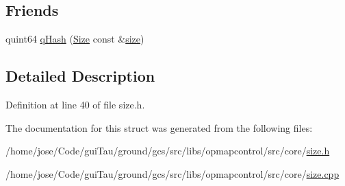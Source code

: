 \subsection*{Friends}
\begin{DoxyCompactItemize}
\item 
quint64 \hyperlink{group___o_p_map_widget_ga49c2077e2f80e6178a3dfbda52f03e88}{q\-Hash} (\hyperlink{structcore_1_1_size}{Size} const \&\hyperlink{glext_8h_a014d89bd76f74ef3a29c8f04b473eb76}{size})
\end{DoxyCompactItemize}


\subsection{Detailed Description}


Definition at line 40 of file size.\-h.



The documentation for this struct was generated from the following files\-:\begin{DoxyCompactItemize}
\item 
/home/jose/\-Code/gui\-Tau/ground/gcs/src/libs/opmapcontrol/src/core/\hyperlink{size_8h}{size.\-h}\item 
/home/jose/\-Code/gui\-Tau/ground/gcs/src/libs/opmapcontrol/src/core/\hyperlink{size_8cpp}{size.\-cpp}\end{DoxyCompactItemize}
